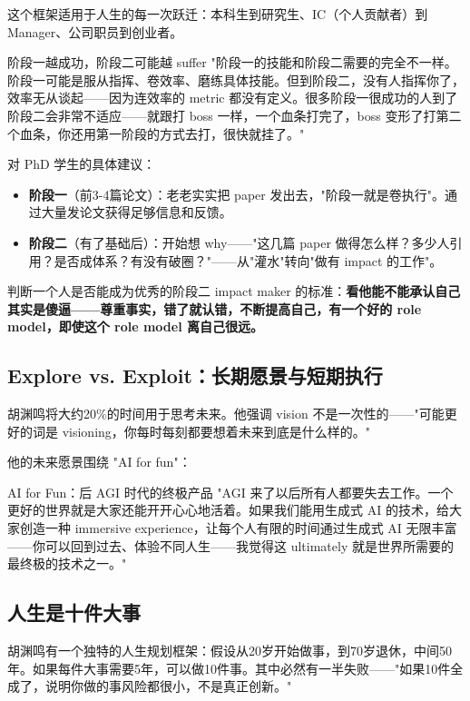 这个框架适用于人生的每一次跃迁：本科生到研究生、IC（个人贡献者）到 Manager、公司职员到创业者。

\begin{warningbox}{阶段一越成功，阶段二可能越 suffer}
"阶段一的技能和阶段二需要的完全不一样。阶段一可能是服从指挥、卷效率、磨练具体技能。但到阶段二，没有人指挥你了，效率无从谈起——因为连效率的 metric 都没有定义。很多阶段一很成功的人到了阶段二会非常不适应——就跟打 boss 一样，一个血条打完了，boss 变形了打第二个血条，你还用第一阶段的方式去打，很快就挂了。"
\end{warningbox}

对 PhD 学生的具体建议：
\begin{itemize}
\item \textbf{阶段一}（前3-4篇论文）：老老实实把 paper 发出去，"阶段一就是卷执行"。通过大量发论文获得足够信息和反馈。
\item \textbf{阶段二}（有了基础后）：开始想 why——"这几篇 paper 做得怎么样？多少人引用？是否成体系？有没有破圈？"——从"灌水"转向"做有 impact 的工作"。
\end{itemize}

判断一个人是否能成为优秀的阶段二 impact maker 的标准：\textbf{看他能不能承认自己其实是傻逼——尊重事实，错了就认错，不断提高自己，有一个好的 role model，即使这个 role model 离自己很远。}

\subsection{Explore vs. Exploit：长期愿景与短期执行}

胡渊鸣将大约20\%的时间用于思考未来。他强调 vision 不是一次性的——"可能更好的词是 visioning，你每时每刻都要想着未来到底是什么样的。"

他的未来愿景围绕 "AI for fun"：

\begin{knowledgebox}{AI for Fun：后 AGI 时代的终极产品}
"AGI 来了以后所有人都要失去工作。一个更好的世界就是大家还能开开心心地活着。如果我们能用生成式 AI 的技术，给大家创造一种 immersive experience，让每个人有限的时间通过生成式 AI 无限丰富——你可以回到过去、体验不同人生——我觉得这 ultimately 就是世界所需要的最终极的技术之一。"
\end{knowledgebox}

\subsection{人生是十件大事}

胡渊鸣有一个独特的人生规划框架：假设从20岁开始做事，到70岁退休，中间50年。如果每件大事需要5年，可以做10件事。其中必然有一半失败——"如果10件全成了，说明你做的事风险都很小，不是真正创新。"

